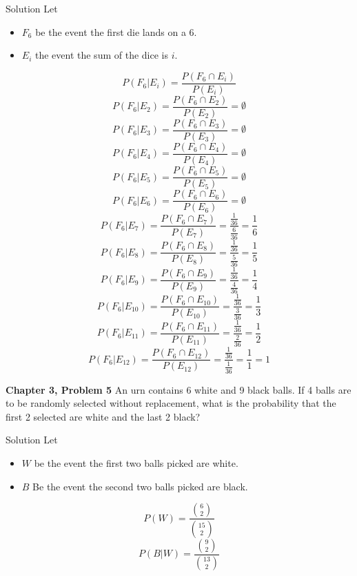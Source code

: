 \documentclass{article}
\begin{document}
\begin{spacing}{1.1}
\begin{homeworkProblem}
  \begin{homeworkSection}{Solution}
    Let
    \begin{itemize}
      \item $F_6$ be the event the first die lands on a 6.
      \item $E_i$ the event the sum of the dice is $i$.
    \end{itemize}
    \[P( F_6|E_i) = \frac{ P( F_6 \cap E_i)}{ P( E_i)}\]
    \[P( F_6|E_2) = \frac{ P( F_6 \cap E_2)}{ P( E_2)} = \emptyset\]
    \[P( F_6|E_3) = \frac{ P( F_6 \cap E_3)}{ P( E_3)} = \emptyset\]
    \[P( F_6|E_4) = \frac{ P( F_6 \cap E_4)}{ P( E_4)} = \emptyset\]
    \[P( F_6|E_5) = \frac{ P( F_6 \cap E_5)}{ P( E_5)} = \emptyset\]
    \[P( F_6|E_6) = \frac{ P( F_6 \cap E_6)}{ P( E_6)} = \emptyset\]
    \[P( F_6|E_7) = \frac{ P( F_6 \cap E_7)}{ P( E_7)} = \frac{ \frac{ 1}{ 36}}{ \frac{ 6}{ 36}} = \frac{ 1}{ 6}\]
    \[P( F_6|E_8) = \frac{ P( F_6 \cap E_8)}{ P( E_8)} = \frac{ \frac{ 1}{ 36}}{ \frac{ 5}{ 36}} = \frac{ 1}{ 5}\]
    \[P( F_6|E_9) = \frac{ P( F_6 \cap E_9)}{ P( E_9)} = \frac{ \frac{ 1}{ 36}}{ \frac{ 4}{ 36}} = \frac{ 1}{ 4}\]
    \[P( F_6|E_10) = \frac{ P( F_6 \cap E_10)}{ P( E_10)} = \frac{ \frac{ 1}{ 36}}{ \frac{ 3}{ 36}} = \frac{ 1}{ 3}\]
    \[P( F_6|E_11) = \frac{ P( F_6 \cap E_11)}{ P( E_11)} = \frac{ \frac{ 1}{ 36}}{ \frac{ 2}{ 36}} = \frac{ 1}{ 2}\]
    \[P( F_6|E_12) = \frac{ P( F_6 \cap E_12)}{ P( E_12)} = \frac{ \frac{ 1}{ 36}}{ \frac{ 1}{ 36}} = \frac{ 1}{ 1} = 1\]
  \end{homeworkSection}
\end{homeworkProblem}
\newpage
\begin{homeworkProblem}
  {\bf Chapter 3, Problem 5}
  An urn contains 6 white and 9 black balls. If 4 balls are to be randomly selected without replacement, 
  what is the probability that the first 2 selected are white and the last 2 black?
  \begin{homeworkSection}{Solution}
    Let
    \begin{itemize}
      \item $W$ be the event the first two balls picked are white.
      \item $B$ Be the event the second two balls picked are black.
    \end{itemize}

    \[P( W) = \frac{ {6 \choose 2}}{ {15 \choose 2}}\]
    \[P( B|W) = \frac{ {9 \choose 2}}{ {13 \choose 2}}\]


\end{homeworkSection}
\end{homeworkProblem}
\end{spacing}
\end{document}
